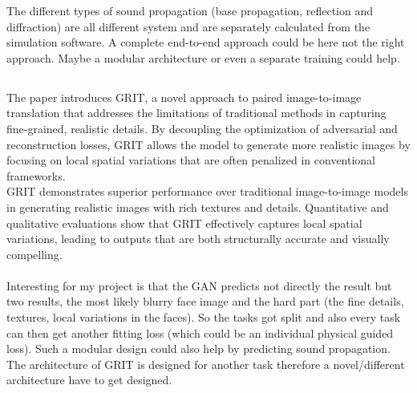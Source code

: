 			The different types of sound propagation (base propagation, reflection and diffraction) are all different system and are separately calculated from the simulation software. A complete end-to-end approach could be here not the right approach. Maybe a modular architecture or even a separate training could help.
			
		\subsection{}
			The paper introduces GRIT, a novel approach to paired image-to-image translation that addresses the limitations of traditional methods in capturing fine-grained, realistic details. By decoupling the optimization of adversarial and reconstruction losses, GRIT allows the model to generate more realistic images by focusing on local spatial variations that are often penalized in conventional frameworks.\\
			GRIT demonstrates superior performance over traditional image-to-image models in generating realistic images with rich textures and details. Quantitative and qualitative evaluations show that GRIT effectively captures local spatial variations, leading to outputs that are both structurally accurate and visually compelling.\\
			\\
			Interesting for my project is that the GAN predicts not directly the result but two results, the most likely blurry face image and the hard part (the fine details, textures, local variations in the faces). So the tasks got split and also every task can then get another fitting loss (which could be an individual physical guided loss). Such a modular design could also help by predicting sound propagation.\\
			The architecture of GRIT is designed for another task therefore a novel/different architecture have to get designed.
			
